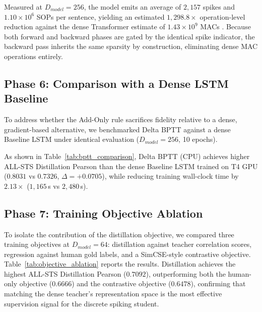 \documentclass[runningheads]{llncs}
\begin{document}
Measured at $D_{model}=256$, the model emits an average of $2{,}157$ spikes and $1.10 \times 10^6$ SOPs per sentence, yielding an estimated $1{,}298.8\times$ operation-level reduction against the dense Transformer estimate of $1.43 \times 10^9$ MACs \cite{horowitz2014computing}. Because both forward and backward phases are gated by the identical spike indicator, the backward pass inherits the same sparsity by construction, eliminating dense MAC operations entirely.

\subsection{Phase 6: Comparison with a Dense LSTM Baseline}
To address whether the Add-Only rule sacrifices fidelity relative to a dense, gradient-based alternative, we benchmarked Delta BPTT against a dense Baseline LSTM under identical evaluation ($D_{model}=256$, 10 epochs).

\begin{table}[t]
\caption{Empirical performance comparison between the Baseline LSTM (T4 GPU) and Delta BPTT (CPU) at $D_{model}=256$.}\label{tab:bptt_comparison}
\centering
{}
\end{table}

As shown in Table~\ref{tab:bptt_comparison}, Delta BPTT (CPU) achieves higher ALL-STS Distillation Pearson than the dense Baseline LSTM trained on T4 GPU ($0.8031$ vs $0.7326$, $\Delta = +0.0705$), while reducing training wall-clock time by $2.13\times$ ($1{,}165$\,s vs $2{,}480$\,s).

\subsection{Phase 7: Training Objective Ablation}
To isolate the contribution of the distillation objective, we compared three training objectives at $D_{model}=64$: distillation against teacher correlation scores, regression against human gold labels, and a SimCSE-style contrastive objective. Table~\ref{tab:objective_ablation} reports the results. Distillation achieves the highest ALL-STS Distillation Pearson ($0.7092$), outperforming both the human-only objective ($0.6666$) and the contrastive objective ($0.6478$), confirming that matching the dense teacher's representation space is the most effective supervision signal for the discrete spiking student.
\end{document}
